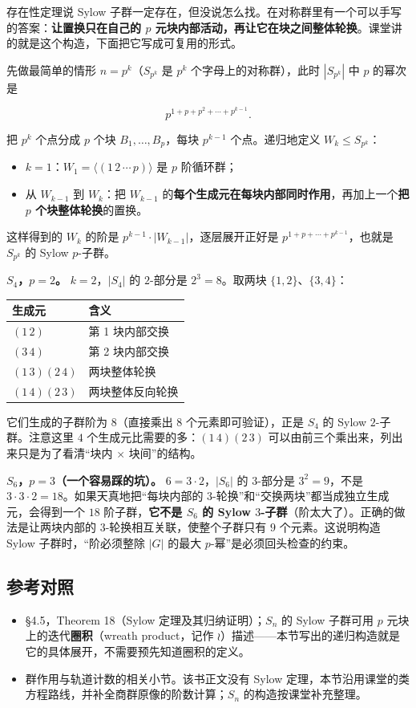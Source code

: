 存在性定理说 Sylow 子群一定存在，但没说怎么找。在对称群里有一个可以手写的答案：\textbf{让置换只在自己的 $p$ 元块内部活动，再让它在块之间整体轮换}。课堂讲的就是这个构造，下面把它写成可复用的形式。

先做最简单的情形 $n=p^k$（$S_{p^k}$ 是 $p^k$ 个字母上的对称群），此时 $|S_{p^k}|$ 中 $p$ 的幂次是

\[
p^{1+p+p^2+\cdots+p^{k-1}}.
\]

把 $p^k$ 个点分成 $p$ 个块 $B_1,\ldots,B_p$，每块 $p^{k-1}$ 个点。递归地定义 $W_k\le S_{p^k}$：

\begin{itemize}
\item $k=1$：$W_1=\langle(1\,2\,\cdots\,p)\rangle$ 是 $p$ 阶循环群；
\item 从 $W_{k-1}$ 到 $W_k$：把 $W_{k-1}$ 的\textbf{每个生成元在每块内部同时作用}，再加上一个\textbf{把 $p$ 个块整体轮换}的置换。
\end{itemize}


这样得到的 $W_k$ 的阶是 $p^{k-1}\cdot|W_{k-1}|$，逐层展开正好是 $p^{1+p+\cdots+p^{k-1}}$，也就是 $S_{p^k}$ 的 Sylow $p$-子群。

\textbf{$S_4$，$p=2$。} $k=2$，$|S_4|$ 的 $2$-部分是 $2^3=8$。取两块 $\{1,2\}$、$\{3,4\}$：


\begin{center}
\begin{tabular}{ll}
生成元 & 含义\\ \hline
$(1\,2)$ & 第 1 块内部交换\\
$(3\,4)$ & 第 2 块内部交换\\
$(1\,3)(2\,4)$ & 两块整体轮换\\
$(1\,4)(2\,3)$ & 两块整体反向轮换
\end{tabular}
\end{center}


它们生成的子群阶为 $8$（直接乘出 $8$ 个元素即可验证），正是 $S_4$ 的 Sylow $2$-子群。注意这里 $4$ 个生成元比需要的多：$(1\,4)(2\,3)$ 可以由前三个乘出来，列出来只是为了看清“块内 $\times$ 块间”的结构。

\textbf{$S_6$，$p=3$（一个容易踩的坑）。} $6=3\cdot2$，$|S_6|$ 的 $3$-部分是 $3^2=9$，不是 $3\cdot3\cdot2=18$。如果天真地把“每块内部的 $3$-轮换”和“交换两块”都当成独立生成元，会得到一个 $18$ 阶子群，\textbf{它不是 $S_6$ 的 Sylow $3$-子群}（阶太大了）。正确的做法是让两块内部的 $3$-轮换相互关联，使整个子群只有 $9$ 个元素。这说明构造 Sylow 子群时，“阶必须整除 $|G|$ 的最大 $p$-幂”是必须回头检查的约束。

\subsection{参考对照}


\begin{itemize}
\item [DF] §4.5，Theorem 18（Sylow 定理及其归纳证明）；$S_n$ 的 Sylow 子群可用 $p$ 元块上的迭代\textbf{圈积}（wreath product，记作 $\wr$）描述——本节写出的递归构造就是它的具体展开，不需要预先知道圈积的定义。
\item [DS] 群作用与轨道计数的相关小节。该书正文没有 Sylow 定理，本节沿用课堂的类方程路线，并补全商群原像的阶数计算；$S_n$ 的构造按课堂补充整理。
\end{itemize}
